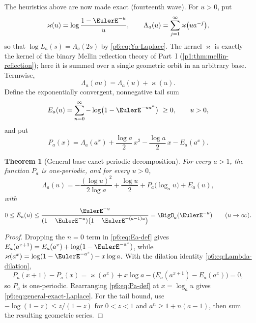 \documentclass[11pt,oneside]{article}
\numberwithin{equation}{section}
\newtheorem{theorem}{Theorem}[section]
\theoremstyle{definition}
\theoremstyle{remark}
\begin{document}
The heuristics above are now made exact (fourteenth wave).  For $u>0$, put
\begin{equation}\label{p6:eq:kernel-varkappa}
 \varkappa(u)=\log\frac{1-\EulerE^{-u}}{u},
 \qquad
 \Lambda_a(u)=\sum_{j=1}^{\infty}\varkappa\bigl(ua^{-j}\bigr),
\end{equation}
so that $\log L_a(s)=\Lambda_a(2s)$ by \eqref{p6:eq:Ya-Laplace}.  The kernel
$\varkappa$ is exactly the kernel of the binary Mellin reflection theory of
Part~I (\cref{p1:thm:mellin-reflection}); here it is summed over a single
geometric orbit in an arbitrary base.  Termwise,
\begin{equation}\label{p6:eq:Lambda-dilation}
 \Lambda_a(au)=\Lambda_a(u)+\varkappa(u).
\end{equation}
Define the exponentially convergent, nonnegative tail sum
\begin{equation}\label{p6:eq:Ea-def}
 E_a(u)=\sum_{n=0}^{\infty}-\log\bigl(1-\EulerE^{-ua^{n}}\bigr)\ \ge0,
 \qquad u>0,
\end{equation}
and put
\begin{equation}\label{p6:eq:Pa-def}
 P_a(x)=\Lambda_a(a^x)+\frac{\log a}{2}\,x^2-\frac{\log a}{2}\,x-E_a(a^x).
\end{equation}

\begin{theorem}[General-base exact periodic decomposition]
\label{p6:thm:general-periodic}
For every $a>1$, the function $P_a$ is one-periodic, and for every $u>0$,
\begin{equation}\label{p6:eq:general-exact-Laplace}
 \Lambda_a(u)=
 -\frac{(\log u)^2}{2\log a}+\frac{\log u}{2}
 +P_a\bigl(\log_au\bigr)+E_a(u),
\end{equation}
with
\begin{equation}\label{p6:eq:Ea-bound}
 0\le E_a(u)\le
 \frac{\EulerE^{-u}}{(1-\EulerE^{-u})\bigl(1-\EulerE^{-(a-1)u}\bigr)}
 =\BigO_a(\EulerE^{-u})
 \qquad(u\to\infty).
\end{equation}
\end{theorem}

\begin{proof}
Dropping the $n=0$ term in \eqref{p6:eq:Ea-def} gives
$E_a(a^{x+1})=E_a(a^x)+\log(1-\EulerE^{-a^x})$, while
$\varkappa(a^x)=\log(1-\EulerE^{-a^x})-x\log a$.  With the dilation identity
\eqref{p6:eq:Lambda-dilation},
\[
 P_a(x+1)-P_a(x)
 =\varkappa(a^x)+x\log a
 -\bigl(E_a(a^{x+1})-E_a(a^x)\bigr)=0,
\]
so $P_a$ is one-periodic.  Rearranging \eqref{p6:eq:Pa-def} at $x=\log_au$
gives \eqref{p6:eq:general-exact-Laplace}.  For the tail bound, use
$-\log(1-z)\le z/(1-z)$ for $0<z<1$ and $a^n\ge1+n(a-1)$, then sum the
resulting geometric series.
\end{proof}
\end{document}
